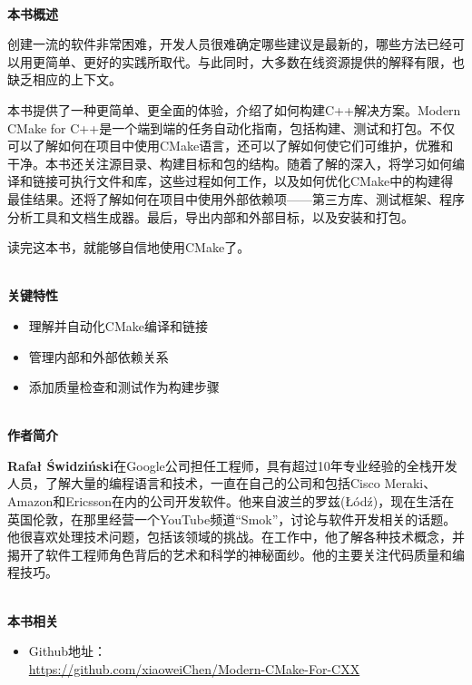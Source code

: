 \documentclass[11pt,a4paper,UTF8]{book}
\begin{document}
\begin{sloppypar}
	\hspace*{\fill} \\ %
	\noindent\textbf{本书概述}
	
	创建一流的软件非常困难，开发人员很难确定哪些建议是最新的，哪些方法已经可以用更简单、更好的实践所取代。与此同时，大多数在线资源提供的解释有限，也缺乏相应的上下文。
	
	本书提供了一种更简单、更全面的体验，介绍了如何构建C++解决方案。Modern CMake for C++是一个端到端的任务自动化指南，包括构建、测试和打包。不仅可以了解如何在项目中使用CMake语言，还可以了解如何使它们可维护，优雅和干净。本书还关注源目录、构建目标和包的结构。随着了解的深入，将学习如何编译和链接可执行文件和库，这些过程如何工作，以及如何优化CMake中的构建得最佳结果。还将了解如何在项目中使用外部依赖项——第三方库、测试框架、程序分析工具和文档生成器。最后，导出内部和外部目标，以及安装和打包。
	
	读完这本书，就能够自信地使用CMake了。
	
	\hspace*{\fill} \\ %
	\noindent\textbf{关键特性}
	\begin{itemize}
		\item 理解并自动化CMake编译和链接
		\item 管理内部和外部依赖关系
		\item 添加质量检查和测试作为构建步骤
	\end{itemize}
	
	\hspace*{\fill} \\ %
	\noindent\textbf{作者简介}
	
	\textbf{Rafał Świdziński}在Google公司担任工程师，具有超过10年专业经验的全栈开发人员，了解大量的编程语言和技术，一直在自己的公司和包括Cisco Meraki、Amazon和Ericsson在内的公司开发软件。他来自波兰的罗兹(Łódź)，现在生活在英国伦敦，在那里经营一个YouTube频道“Smok”，讨论与软件开发相关的话题。他很喜欢处理技术问题，包括该领域的挑战。在工作中，他了解各种技术概念，并揭开了软件工程师角色背后的艺术和科学的神秘面纱。他的主要关注代码质量和编程技巧。
	
	\hspace*{\fill} \\ %
	\noindent\textbf{本书相关}
	\begin{itemize}
		\item Github地址：\\\url{https://github.com/xiaoweiChen/Modern-CMake-For-CXX}
	\end{itemize}
	\newpage
	

\end{sloppypar}
\end{document}

